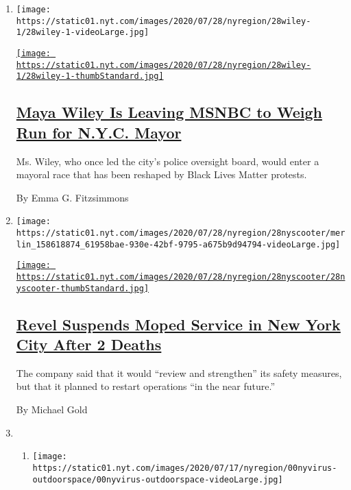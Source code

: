 \begin{enumerate}
\def\labelenumi{\arabic{enumi}.}
\item
  \texttt{[image: https://static01.nyt.com/images/2020/07/28/nyregion/28wiley-1/28wiley-1-videoLarge.jpg]}

  \href{/2020/07/28/nyregion/maya-wiley-mayor-nyc.html}{\texttt{[image: https://static01.nyt.com/images/2020/07/28/nyregion/28wiley-1/28wiley-1-thumbStandard.jpg]}}

  \hypertarget{maya-wiley-is-leaving-msnbc-to-weigh-run-for-nyc-mayor}{%
  \subsection{\texorpdfstring{\href{/2020/07/28/nyregion/maya-wiley-mayor-nyc.html}{Maya
  Wiley Is Leaving MSNBC to Weigh Run for N.Y.C.
  Mayor}}{Maya Wiley Is Leaving MSNBC to Weigh Run for N.Y.C. Mayor}}\label{maya-wiley-is-leaving-msnbc-to-weigh-run-for-nyc-mayor}}

  Ms. Wiley, who once led the city's police oversight board, would enter
  a mayoral race that has been reshaped by Black Lives Matter protests.

  By Emma G. Fitzsimmons
\item
  \texttt{[image: https://static01.nyt.com/images/2020/07/28/nyregion/28nyscooter/merlin\_158618874\_61958bae-930e-42bf-9795-a675b9d94794-videoLarge.jpg]}

  \href{/2020/07/28/nyregion/revel-scooters-death-nyc.html}{\texttt{[image: https://static01.nyt.com/images/2020/07/28/nyregion/28nyscooter/28nyscooter-thumbStandard.jpg]}}

  \hypertarget{revel-suspends-moped-service-in-new-york-city-after-2-deaths}{%
  \subsection{\texorpdfstring{\href{/2020/07/28/nyregion/revel-scooters-death-nyc.html}{Revel
  Suspends Moped Service in New York City After 2
  Deaths}}{Revel Suspends Moped Service in New York City After 2 Deaths}}\label{revel-suspends-moped-service-in-new-york-city-after-2-deaths}}

  The company said that it would ``review and strengthen'' its safety
  measures, but that it planned to restart operations ``in the near
  future.''

  By Michael Gold
\item
  \begin{enumerate}
  \def\labelenumii{\arabic{enumii}.}
  \item
    \texttt{[image: https://static01.nyt.com/images/2020/07/17/nyregion/00nyvirus-outdoorspace/00nyvirus-outdoorspace-videoLarge.jpg]}


\end{enumerate}
\end{enumerate}
